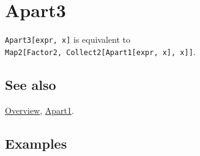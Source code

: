 \documentclass[../FeynCalcManual.tex]{subfiles}
\begin{document}
\hypertarget{apart3}{%
\section{Apart3}\label{apart3}}

\texttt{Apart3[\allowbreak{}expr,\ \allowbreak{}x]} is equivalent to
\texttt{Map2[\allowbreak{}Factor2,\ \allowbreak{}Collect2[\allowbreak{}Apart1[\allowbreak{}expr,\ \allowbreak{}x],\ \allowbreak{}x]]}.

\subsection{See also}

\hyperlink{toc}{Overview}, \hyperlink{apart1}{Apart1}.

\subsection{Examples}
\end{document}

